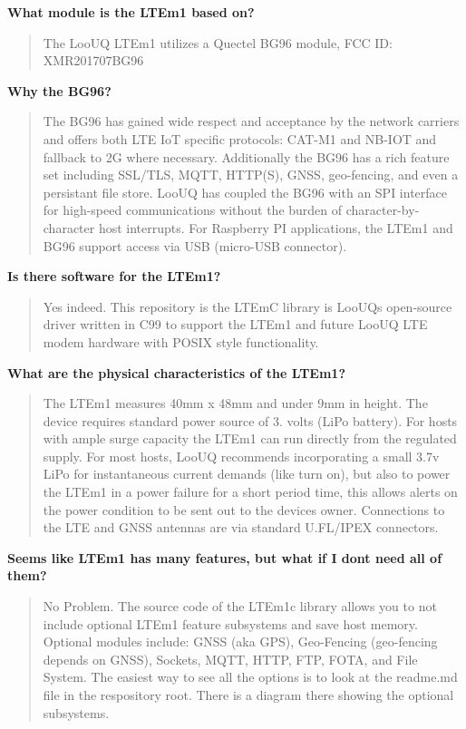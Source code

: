 {\bfseries{What module is the L\+T\+Em1 based on?}} \begin{quote}
The Loo\+UQ L\+T\+Em1 utilizes a Quectel B\+G96 module, F\+CC ID\+: X\+M\+R201707\+B\+G96 \end{quote}


{\bfseries{Why the B\+G96?}} \begin{quote}
The B\+G96 has gained wide respect and acceptance by the network carriers and offers both L\+TE IoT specific protocols\+: C\+A\+T-\/\+M1 and N\+B-\/\+I\+OT and fallback to 2G where necessary. Additionally the B\+G96 has a rich feature set including S\+S\+L/\+T\+LS, M\+Q\+TT, H\+T\+T\+P(\+S), G\+N\+SS, geo-\/fencing, and even a persistant file store. Loo\+UQ has coupled the B\+G96 with an S\+PI interface for high-\/speed communications without the burden of character-\/by-\/character host interrupts. For Raspberry PI applications, the L\+T\+Em1 and B\+G96 support access via U\+SB (micro-\/\+U\+SB connector). \end{quote}


{\bfseries{Is there software for the L\+T\+Em1?}} \begin{quote}
Yes indeed. This repository is the L\+T\+EmC library is Loo\+UQ\textquotesingle{}s open-\/source driver written in C99 to support the L\+T\+Em1 and future Loo\+UQ L\+TE modem hardware with P\+O\+S\+IX style functionality. \end{quote}


{\bfseries{What are the physical characteristics of the L\+T\+Em1?}} \begin{quote}
The L\+T\+Em1 measures 40mm x 48mm and under 9mm in height. The device requires standard power source of 3. volts (Li\+Po battery). For hosts with ample surge capacity the L\+T\+Em1 can run directly from the regulated supply. For most hosts, Loo\+UQ recommends incorporating a small 3.\+7v Li\+Po for instantaneous current demands (like turn on), but also to power the L\+T\+Em1 in a power failure for a short period time, this allows alerts on the power condition to be sent out to the devices owner. Connections to the L\+TE and G\+N\+SS antennas are via standard U.\+FL/\+I\+P\+EX connectors. \end{quote}


{\bfseries{Seems like L\+T\+Em1 has many features, but what if I don\textquotesingle{}t need all of them?}} \begin{quote}
No Problem. The source code of the L\+T\+Em1c library allows you to not include optional L\+T\+Em1 feature subsystems and save host memory. Optional modules include\+: G\+N\+SS (aka G\+PS), Geo-\/\+Fencing (geo-\/fencing depends on G\+N\+SS), Sockets, M\+Q\+TT, H\+T\+TP, F\+TP, F\+O\+TA, and File System. The easiest way to see all the options is to look at the readme.\+md file in the respository root. There is a diagram there showing the optional subsystems. \end{quote}


